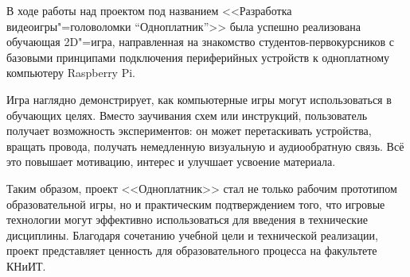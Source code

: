 В ходе работы над проектом под названием <<Разработка видеоигры"=головоломки “Одноплатник”>> была успешно реализована обучающая 2D"=игра, направленная на знакомство студентов-первокурсников с базовыми принципами подключения периферийных устройств к одноплатному компьютеру Raspberry Pi. 

Игра наглядно демонстрирует, как компьютерные игры могут использоваться в обучающих целях. Вместо заучивания схем или инструкций, пользователь получает возможность экспериментов: он может перетаскивать устройства, вращать провода, получать немедленную визуальную и аудиообратную связь. Всё это повышает мотивацию, интерес и улучшает усвоение материала.

Таким образом, проект <<Одноплатник>> стал не только рабочим прототипом образовательной игры, но и практическим подтверждением того, что игровые технологии могут эффективно использоваться для введения в технические дисциплины. Благодаря сочетанию учебной цели и технической реализации, проект представляет ценность для образовательного процесса на факультете КНиИТ.